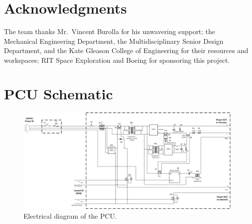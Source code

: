 \documentclass[journal]{IEEEtran}
\begin{document}
\section*{Acknowledgments}
The team thanks Mr.~Vincent Burolla for his unwavering support; the Mechanical Engineering Department, the Multidisciplinary Senior Design Department, and the Kate Gleason College of Engineering for their resources and workspaces; RIT Space Exploration and Boeing for sponsoring this project.





\onecolumn
\appendices{}
\section{PCU Schematic}
\begin{figure}[h!]
  \includegraphics[angle=90,height=.9\vsize,keepaspectratio]{figs/PCU.jpg}
  \caption{Electrical diagram of the PCU.}
\label{fig:pcu-schematic}
\end{figure}
\end{document}
